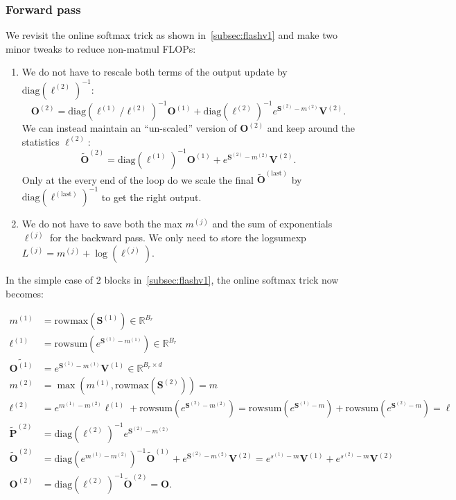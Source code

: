 \subsubsection{Forward pass}

We revisit the online softmax trick as shown in~\ref{subsec:flashv1} and make two minor tweaks to reduce non-matmul FLOPs:

\begin{enumerate}
  \item We do not have to rescale both terms of the output update by $\mathrm{diag}(\ell^{(2)})^{-1}$:
  \begin{equation*}
    \mathbf{O}^{(2)} = \mathrm{diag}(\ell^{(1)} / \ell^{(2)})^{-1} \mathbf{O}^{(1)} + \mathrm{diag}(\ell^{(2)})^{-1} e^{\mathbf{S}^{(2)} - m^{(2)}} \mathbf{V}^{(2)}.
  \end{equation*}
  We can instead maintain an ``un-scaled'' version of $\mathbf{O}^{(2)}$ and keep around the statistics $\ell^{(2)}$:
  \begin{equation*}
    \tilde{\mathbf{O}}^{(2)} = \mathrm{diag}(\ell^{(1)})^{-1} \mathbf{O}^{(1)} + e^{\mathbf{S}^{(2)} - m^{(2)}} \mathbf{V}^{(2)}.
  \end{equation*}
  Only at the every end of the loop do we scale the final
  $\tilde{\mathbf{O}}^{(\mathrm{last})}$ by $\mathrm{diag}(\ell^{(\mathrm{last})})^{-1}$ to get the right output.

  \item We do not have to save both the max $m^{(j)}$ and the sum of exponentials $\ell^{(j)}$ for the backward pass. We only need to store the logsumexp $L^{(j)} = m^{(j)} + \log(\ell^{(j)})$.
\end{enumerate}

In the simple case of 2 blocks in~\ref{subsec:flashv1}, the online softmax trick now becomes:

\begin{align*}
  m^{(1)} &= \mathrm{rowmax}(\mathbf{S}^{(1)})  \in \mathbb{R}^{B_r}\\
  \ell^{(1)} &= \mathrm{rowsum}(e^{\mathbf{S}^{(1)} - m^{(1)}}) \in \mathbb{R}^{B_r} \\
  \tilde{\mathbf{O}^{(1)}} &= e^{\mathbf{S}^{(1)} - m^{(1)}} \mathbf{V}^{(1)} \in \mathbb{R}^{B_r \times d}\\
  m^{(2)} &= \max(m^{(1)}, \mathrm{rowmax}(\mathbf{S}^{(2)})) = m \\
  \ell^{(2)} &= e^{m^{(1)} - m^{(2)}} \ell^{(1)} + \mathrm{rowsum}(e^{\mathbf{S}^{(2)} - m^{(2)}}) = \mathrm{rowsum}(e^{\mathbf{S}^{(1)} - m}) + \mathrm{rowsum}(e^{\mathbf{S}^{(2)} - m}) = \ell \\
  \tilde{\mathbf{P}}^{(2)} &= \mathrm{diag}(\ell^{(2)})^{-1} e^{\mathbf{S}^{(2)} - m^{(2)}} \\
  \tilde{\mathbf{O}}^{(2)} &= \mathrm{diag}(e^{m^{(1)} - m^{(2)}})^{-1} \tilde{\mathbf{O}}^{(1)} + e^{\mathbf{S}^{(2)} - m^{(2)}} \mathbf{V}^{(2)} = e^{s^{(1)} - m} \mathbf{V}^{(1)} + e^{s^{(2)} - m} \mathbf{V}^{(2)} \\
  \mathbf{O}^{(2)} &= \mathrm{diag}(\ell^{(2)})^{-1} \tilde{\mathbf{O}}^{(2)} = \mathbf{O}.
\end{align*}

